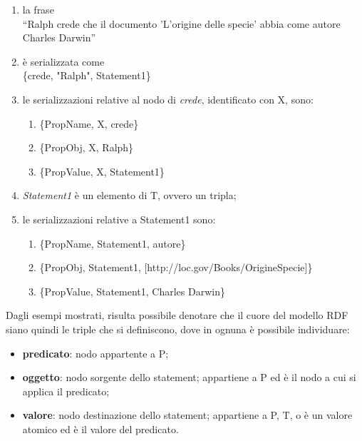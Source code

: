 \documentclass[12pt,a4paper,twoside]{book}
\begin{document}
\begin{enumerate}
\item la frase \\``Ralph crede che il documento 'L'origine delle specie' abbia come autore Charles Darwin''
\item è serializzata come \\ \{crede, "Ralph", Statement1\}
\item le serializzazioni relative al nodo di \textit{crede}, identificato con X, sono:
\begin{enumerate}
\item \{PropName,  X, crede\}
\item \{PropObj,   X, Ralph\}
\item \{PropValue, X, Statement1\}
\end{enumerate}
\item \textit{Statement1} è un elemento di T, ovvero un tripla;
\item le serializzazioni relative a Statement1 sono:
\begin{enumerate}
\item \{PropName, Statement1, autore\}
\item \{PropObj, Statement1, [http://loc.gov/Books/OrigineSpecie]\}
\item \{PropValue, Statement1, Charles Darwin\}
\end{enumerate}
\end{enumerate}
Dagli esempi mostrati, risulta possibile denotare che il cuore del modello RDF siano quindi le triple che si definiscono, dove in ognuna è possibile individuare:
\begin{itemize}
\item \textbf{predicato}: nodo appartente a P;
\item \textbf{oggetto}: nodo sorgente dello statement; appartiene a P ed è il nodo a cui si applica il predicato;
\item \textbf{valore}: nodo destinazione dello statement; appartiene a P, T, o è un valore atomico ed è il valore del predicato.
\end{itemize}
\end{document}
